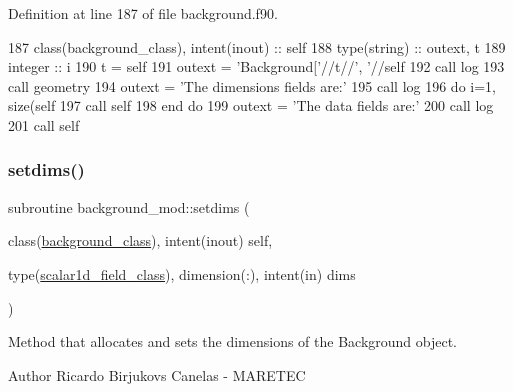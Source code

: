 Definition at line 187 of file background.\+f90.


\begin{DoxyCode}
187     \textcolor{keywordtype}{class}(background\_class), \textcolor{keywordtype}{intent(inout)} :: self
188     \textcolor{keywordtype}{type}(string) :: outext, t
189     \textcolor{keywordtype}{integer} :: i
190     t = self%
191     outext = \textcolor{stringliteral}{'Background['}//t//\textcolor{stringliteral}{', '}//self%
192     \textcolor{keyword}{call }log%
193     \textcolor{keyword}{call }geometry%
194     outext = \textcolor{stringliteral}{'The dimensions fields are:'}
195     \textcolor{keyword}{call }log%
196     \textcolor{keywordflow}{do} i=1, \textcolor{keyword}{size}(self%
197         \textcolor{keyword}{call }self%
198 \textcolor{keywordflow}{    end do}
199     outext = \textcolor{stringliteral}{'The data fields are:'}
200     \textcolor{keyword}{call }log%
201     \textcolor{keyword}{call }self%
\end{DoxyCode}
\mbox{\label{namespacebackground__mod_a06d96d4627391d74feb105a842a87dc0}} 
\subsubsection{\texorpdfstring{setdims()}{setdims()}}
{\footnotesize\ttfamily subroutine background\+\_\+mod\+::setdims (\begin{DoxyParamCaption}\item[{class(\mbox{\hyperlink{structbackground__mod_1_1background__class}{background\+\_\+class}}), intent(inout)}]{self,  }\item[{type(\mbox{\hyperlink{structfield__types__mod_1_1scalar1d__field__class}{scalar1d\+\_\+field\+\_\+class}}), dimension(\+:), intent(in)}]{dims }\end{DoxyParamCaption})\hspace{0.3cm}{\ttfamily [private]}}



Method that allocates and sets the dimensions of the Background object. 

\begin{DoxyAuthor}{Author}
Ricardo Birjukovs Canelas -\/ M\+A\+R\+E\+T\+EC 
\end{DoxyAuthor}

